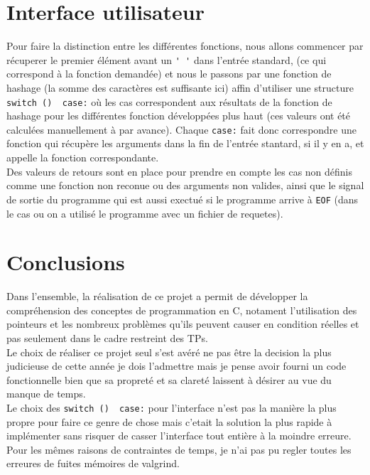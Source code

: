 \documentclass[a4paper, 12pt]{article}
\begin{document}
	\section{Interface utilisateur}
	Pour faire la distinction entre les différentes fonctions, nous allons commencer par récuperer le premier élément avant un \lstinline|' '| dans l'entrée standard, (ce qui correspond à la fonction demandée) et nous le passons par une fonction de hashage (la somme des caractères est suffisante ici) affin d'utiliser une structure \lstinline|switch ()  case:| où les cas correspondent aux résultats de la fonction de hashage pour les différentes fonction développées plus haut (ces valeurs ont été calculées manuellement à par avance). Chaque \lstinline|case:| fait donc correspondre une fonction qui récupère les arguments dans la fin de l'entrée stantard, si il y en a, et appelle la fonction correspondante.\\
	Des valeurs de retours sont en place pour prendre en compte les cas non définis comme une fonction non reconue ou des arguments non valides, ainsi que le signal de sortie du programme qui est aussi exectué si le programme arrive à \lstinline|EOF| (dans le cas ou on a utilisé le programme avec un fichier de requetes).\\
	\newpage
	\section{Conclusions}
	Dans l'ensemble, la réalisation de ce projet a permit de développer la compréhension des conceptes de programmation en C, notament l'utilisation des pointeurs et les nombreux problèmes qu'ils peuvent causer en condition réelles et pas seulement dans le cadre restreint des TPs.\\
	Le choix de réaliser ce projet seul s'est avéré ne pas être la decision la plus judicieuse de cette année je dois l'admettre mais je pense avoir fourni un code fonctionnelle bien que sa propreté et sa clareté laissent à désirer au vue du manque de temps.\\
	Le choix des \lstinline|switch ()  case:| pour l'interface n'est pas la manière la plus propre pour faire ce genre de chose mais c'etait la solution la plus rapide à implémenter sans risquer de casser l'interface tout entière à la moindre erreure.\\  
	Pour les mêmes raisons de contraintes de temps, je n'ai pas pu regler toutes les erreures de fuites mémoires de valgrind.\\
	
	
	
	
\end{document}
